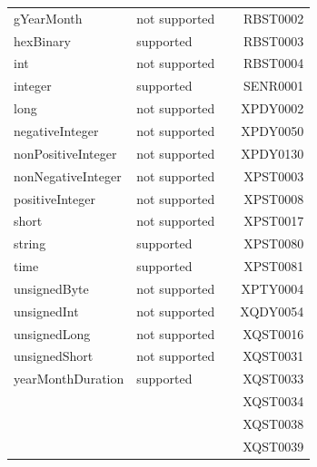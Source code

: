 \begin{table}[]
\begin{tabular}{lllr}
		gYearMonth         & not supported   &  & RBST0002                                           \\
		hexBinary          & supported       &  & RBST0003                                           \\
		int                & not supported   &  & RBST0004                                           \\
		integer            & supported       &  & SENR0001                                           \\
		long               & not supported   &  & XPDY0002                                           \\
		negativeInteger    & not supported   &  & XPDY0050                                           \\
		nonPositiveInteger & not supported   &  & XPDY0130                                           \\
		nonNegativeInteger & not supported   &  & XPST0003                                           \\
		positiveInteger    & not supported   &  & XPST0008                                           \\
		short              & not supported   &  & XPST0017                                           \\
		string             & supported       &  & XPST0080                                           \\
		time               & supported       &  & XPST0081                                           \\
		unsignedByte       & not supported   &  & XPTY0004                                           \\
		unsignedInt        & not supported   &  & XQDY0054                                           \\
		unsignedLong       & not supported   &  & XQST0016                                           \\
		unsignedShort      & not supported   &  & XQST0031                                           \\
		yearMonthDuration  & supported       &  & XQST0033                                           \\
		&                 &  & XQST0034                                           \\
		&                 &  & XQST0038                                           \\
		&                 &  & XQST0039                                           \\

\end{tabular}
\end{table}
